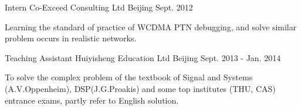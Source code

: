 \begin{cventries}
  \cventry
    {Intern}
    {Co-Exceed Consulting Ltd}
    {Beijing}
    {Sept. 2012}
    {
      \begin{cvitems}
        \item {Learning the standard of practice of WCDMA PTN debugging, and solve similar problem occurs in realistic networks.}
      \end{cvitems}
    }

  \cventry   
    {Teaching Assistant}
    {Huiyisheng Education Ltd}
    {Beijing}
    {Sept. 2013 - Jan. 2014}
    {
      \begin{cvitems}
        \item {To solve the complex problem of the textbook of Signal and Systems (A.V.Oppenheim), DSP(J.G.Proakis) and some top institutes  (THU, CAS) entrance exams, partly refer to English solution.}
      \end{cvitems}
    }

\end{cventries}